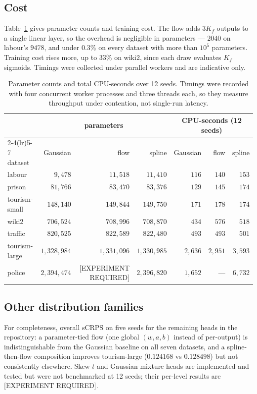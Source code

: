 \documentclass[11pt]{article}
\begin{document}
\subsection{Cost}
Table~\ref{tab:complexity} gives parameter counts and training cost. The flow adds
$3 K_f$ outputs to a single linear layer, so the overhead is negligible in
parameters --- $2040$ on labour's $9478$, and under $0.3\%$ on every dataset with
more than $10^5$ parameters. Training cost rises more, up to $33\%$ on wiki2, since
each draw evaluates $K_f$ sigmoids. Timings were collected under parallel workers and
are indicative only.

\begin{table}[t]
\centering
\caption{Parameter counts and total CPU-seconds over 12 seeds. Timings were recorded
with four concurrent worker processes and three threads each, so they measure
throughput under contention, not single-run latency.}
\label{tab:complexity}
\small
\begin{tabular}{lrrrrrr}
\toprule
 & \multicolumn{3}{c}{parameters} & \multicolumn{3}{c}{CPU-seconds (12 seeds)} \\
\cmidrule(lr){2-4}\cmidrule(lr){5-7}
dataset & Gaussian & flow & spline & Gaussian & flow & spline \\
\midrule
labour        & $9{,}478$     & $11{,}518$    & $11{,}410$    & $116$  & $140$  & $153$ \\
prison        & $81{,}766$    & $83{,}470$    & $83{,}376$    & $129$  & $145$  & $174$ \\
tourism-small & $148{,}140$   & $149{,}844$   & $149{,}750$   & $171$  & $178$  & $174$ \\
wiki2         & $706{,}524$   & $708{,}996$   & $708{,}870$   & $434$  & $576$  & $518$ \\
traffic       & $820{,}525$   & $822{,}589$   & $822{,}480$   & $493$  & $493$  & $501$ \\
tourism-large & $1{,}328{,}984$ & $1{,}331{,}096$ & $1{,}330{,}985$ & $2{,}636$ & $2{,}951$ & $3{,}593$ \\
police        & $2{,}394{,}474$ & [EXPERIMENT REQUIRED] & $2{,}396{,}820$ & $1{,}652$ & --- & $6{,}732$ \\
\bottomrule
\end{tabular}
\end{table}

\subsection{Other distribution families}
For completeness, overall sCRPS on five seeds for the remaining heads in the
repository: a parameter-tied flow (one global $(w,a,b)$ instead of per-output) is
indistinguishable from the Gaussian baseline on all seven datasets, and a
spline-then-flow composition improves tourism-large ($0.124168$ vs $0.128498$) but
not consistently elsewhere. Skew-$t$ and Gaussian-mixture heads are implemented and
tested but were not benchmarked at 12 seeds; their per-level results are
[EXPERIMENT REQUIRED].
\end{document}
